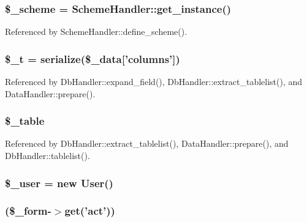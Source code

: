 \subsubsection[{\$\_\-scheme}]{\setlength{\rightskip}{0pt plus 5cm}\$\_\-scheme = SchemeHandler::get\_\-instance()}\label{index_8php_abb5321c25f21f089f5c253d5f2697502}


Referenced by SchemeHandler::define\_\-scheme().

\subsubsection[{\$\_\-t}]{\setlength{\rightskip}{0pt plus 5cm}\$\_\-t = serialize(\$\_\-data\mbox{[}'columns'\mbox{]})}\label{index_8php_a7a22c26026cc0626b015085e752b45cb}


Referenced by DbHandler::expand\_\-field(), DbHandler::extract\_\-tablelist(), and DataHandler::prepare().

\subsubsection[{\$\_\-table}]{\setlength{\rightskip}{0pt plus 5cm}\$\_\-table}\label{index_8php_ac0ee5b766d19cb282552a3449a1f8376}


Referenced by DbHandler::extract\_\-tablelist(), DataHandler::prepare(), and DbHandler::tablelist().

\subsubsection[{\$\_\-user}]{\setlength{\rightskip}{0pt plus 5cm}\$\_\-user = new {\bf User}()}\label{index_8php_a5df5982b9dadc74df05081972cd67fdf}
\subsubsection[{switch}]{(\$\_\-form-\/$>$get('act'))}\label{index_8php_aa284f7d5270c1aa684d885f7bb70d532}
